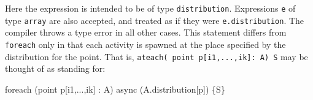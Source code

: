 Here the expression is intended to be of type {\tt distribution}.
Expressions {\tt e} of type {\tt array} are also accepted, and treated
as if they were {\tt e.distribution}. The compiler throws a type error
in all other cases. This statement differs from {\tt foreach} only in
that each activity is spawned at the place specified by the
distribution for the point. That is, 
{\tt ateach( point p[i1,...,ik]: A) S} may
be thought of as standing for:
\begin{x10}
  foreach (point p[i1,...,ik] : A) 
    async (A.distribution[p]) \{S\}
\end{x10}

